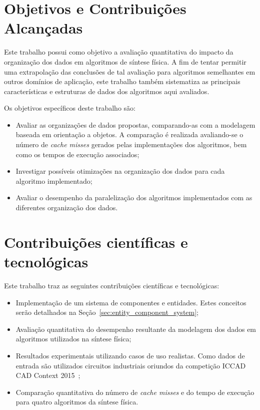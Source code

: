 \section{Objetivos e Contribuições Alcançadas}

    Este trabalho possui como objetivo a avaliação quantitativa do impacto da organização dos dados em algoritmos de síntese física. 
    A fim de tentar permitir uma extrapolação das conclusões de tal avaliação para algoritmos semelhantes em outros domínios de aplicação, este trabalho também sistematiza as principais características e estruturas de dados dos algoritmos aqui avaliados.

    Os objetivos específicos deste trabalho são:

    \begin{itemize}
        \item Avaliar as organizações de dados propostas, comparando-as com a modelagem baseada em orientação a objetos. A comparação é realizada avaliando-se o número de \textit{cache misses} gerados pelas implementações dos algoritmos, bem como os tempos de execução associados;
        \item Investigar possíveis otimizações na organização dos dados para cada algoritmo implementado;
        \item Avaliar o desempenho da paralelização dos algoritmos implementados com as diferentes organização dos dados.
    \end{itemize}

\section{Contribuições científicas e tecnológicas}

    Este trabalho traz as seguintes contribuições científicas e tecnológicas:

    \begin{itemize}
        \item Implementação de um sistema de componentes e entidades. Estes conceitos serão detalhados na Seção~\ref{sec:entity_component_system};
        \item Avaliação quantitativa do desempenho resultante da modelagem dos dados em algoritmos utilizados na síntese física;
        \item Resultados experimentais utilizando casos de uso realistas. Como dados de entrada são utilizados circuitos industriais oriundos da competição ICCAD CAD Context 2015~\cite{kim2015};
        \item Comparação quantitativa do número de \textit{cache misses} e do tempo de execução para quatro algoritmos da síntese física.  
    \end{itemize}


